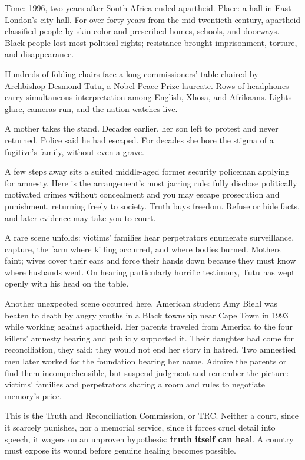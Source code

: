 Time: 1996, two years after South Africa ended apartheid. Place: a hall in East London's city hall. For over forty years from the mid-twentieth century, apartheid classified people by skin color and prescribed homes, schools, and doorways. Black people lost most political rights; resistance brought imprisonment, torture, and disappearance.

Hundreds of folding chairs face a long commissioners' table chaired by Archbishop Desmond Tutu, a Nobel Peace Prize laureate. Rows of headphones carry simultaneous interpretation among English, Xhosa, and Afrikaans. Lights glare, cameras run, and the nation watches live.

A mother takes the stand. Decades earlier, her son left to protest and never returned. Police said he had escaped. For decades she bore the stigma of a fugitive's family, without even a grave.

A few steps away sits a suited middle-aged former security policeman applying for amnesty. Here is the arrangement's most jarring rule: fully disclose politically motivated crimes without concealment and you may escape prosecution and punishment, returning freely to society. Truth buys freedom. Refuse or hide facts, and later evidence may take you to court.

A rare scene unfolds: victims' families hear perpetrators enumerate surveillance, capture, the farm where killing occurred, and where bodies burned. Mothers faint; wives cover their ears and force their hands down because they must know where husbands went. On hearing particularly horrific testimony, Tutu has wept openly with his head on the table.

Another unexpected scene occurred here. American student Amy Biehl was beaten to death by angry youths in a Black township near Cape Town in 1993 while working against apartheid. Her parents traveled from America to the four killers' amnesty hearing and publicly supported it. Their daughter had come for reconciliation, they said; they would not end her story in hatred. Two amnestied men later worked for the foundation bearing her name. Admire the parents or find them incomprehensible, but suspend judgment and remember the picture: victims' families and perpetrators sharing a room and rules to negotiate memory's price.

This is the Truth and Reconciliation Commission, or TRC. Neither a court, since it scarcely punishes, nor a memorial service, since it forces cruel detail into speech, it wagers on an unproven hypothesis: \textbf{truth itself can heal}. A country must expose its wound before genuine healing becomes possible.

